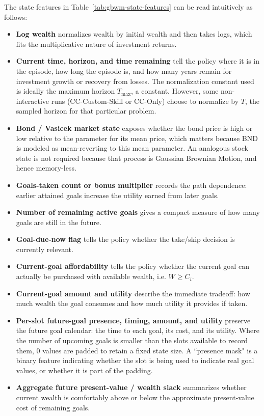 \documentclass[mnsc,sglanonrev]{informs4}
\begin{document}
\begin{APPENDICES}
The state features in Table~\ref{tab:gbwm-state-features} can be read intuitively as follows:
\begin{itemize}
  \item \textbf{Log wealth} normalizes wealth by initial wealth and then takes logs, which fits the multiplicative nature of investment returns.
  \item \textbf{Current time, horizon, and time remaining} tell the policy where it is in the episode, how long the episode is, and how many years remain for investment growth or recovery from losses. The normalization constant used is ideally the maximum horizon $T_\mathrm{max}$, a constant. However, some non-interactive runs (CC-Custom-Skill or CC-Only) choose to normalize by $T$, the sampled horizon for that particular problem.
  \item \textbf{Bond / Vasicek market state} exposes whether the bond price is high or low relative to the parameter for its mean price, which matters because BND is modeled as mean-reverting to this mean parameter. An analogous stock state is not required because that process is Gaussian Brownian Motion, and hence memory-less.
  \item \textbf{Goals-taken count or bonus multiplier} records the path dependence: earlier attained goals increase the utility earned from later goals.
  \item \textbf{Number of remaining active goals} gives a compact measure of how many goals are still in the future.
  \item \textbf{Goal-due-now flag} tells the policy whether the take/skip decision is currently relevant.
  \item \textbf{Current-goal affordability} tells the policy whether the current goal can actually be purchased with available wealth, i.e. $W\geq C_i$.
  \item \textbf{Current-goal amount and utility} describe the immediate tradeoff: how much wealth the goal consumes and how much utility it provides if taken.
  \item \textbf{Per-slot future-goal presence, timing, amount, and utility} preserve the future goal calendar: the time to each goal, its cost, and its utility. Where the number of upcoming goals is smaller than the slots available to record them, $0$ values are padded to retain a fixed state size. A ``presence mask" is a binary feature indicating whether the slot is being used to indicate real goal values, or whether it is part of the padding.
  \item \textbf{Aggregate future present-value / wealth slack} summarizes whether current wealth is comfortably above or below the approximate present-value cost of remaining goals.

\end{itemize}
\end{APPENDICES}
\end{document}
